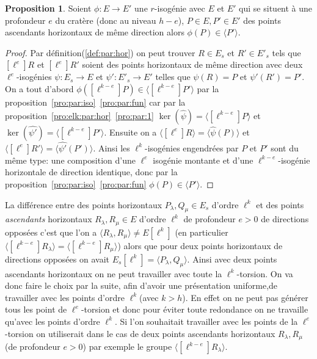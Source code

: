 \documentclass[10pt,a4paper]{book}
\theoremstyle{plain}
\theoremstyle{definition}
\theoremstyle{definition}
\theoremstyle{definition}
\theoremstyle{definition}
\newtheorem{prop}[thm]{Proposition}
\theoremstyle{definition}
\theoremstyle{remark}
\theoremstyle{remark}
\theoremstyle{definition}
\begin{document}
\begin{prop}
\label{pro:par:hor:par}
Soient $\phi: E \rightarrow E'$ une $r$-isogénie avec $E$ et $E'$ qui se
situent à une profondeur $e$ du cratère (donc au niveau $h-e$), $P \in E,P' \in
E'$ des points ascendants horizontaux de même direction alors $\phi(P) \in 
\langle P' \rangle$. 
\end{prop}

\begin{proof}
Par définition(\ref{def:par:hor}) on peut trouver
$R \in E_s$ et $R' \in E'_s$ tels que $[\ell^e]R$ et $[\ell^e]R'$ 
soient des points horizontaux de même direction avec deux $\ell^e$-isogénies 
$\psi:E_s \rightarrow E$ et $\psi':E'_s \rightarrow E'$ telles que $\psi(R)=P$ 
et $\psi'(R')=P'$. On a tout d'abord $ \phi([\ell^{k-e}]P) \in \langle 
[\ell^{k-e}]P' \rangle$  par la proposition~\ref{pro:par:iso}~\eqref{pro:par:fun} car par la 
proposition~\ref{pro:elk:par:hor}~\eqref{pro:par:1} $\ker(\widehat{\psi})= \langle 
[\ell^{k-e}]P \rangle$ et $\ker(\widehat{\psi'})= \langle [\ell^{k-e}]P' 
\rangle$. Ensuite on a $\langle [\ell^e]R \rangle = \langle 
\widehat{\psi}(P) \rangle $ et $\langle [\ell^e]R' \rangle = \langle 
\widehat{\psi'}(P') \rangle$. Ainsi les $\ell^{k}$-isogénies engendrées par 
$P$ et $P'$ sont du même type: une composition d'une $\ell^e$ isogénie montante 
et d'une $\ell^{k-e}$-isogénie horizontale de direction identique, donc par la 
proposition~\ref{pro:par:iso}~\eqref{pro:par:fun} $\phi(P) \in \langle P' \rangle$.
\end{proof}


La différence entre des points horizontaux $P_{\lambda}, Q_{\mu} \in E_s$ 
d'ordre $\ell^k$ et des points \emph{ascendants} horizontaux $R_{\lambda}, 
R_{\mu} \in E$ d'ordre $\ell^k$ de profondeur $e>0$ de directions opposées 
c'est que l'on a $\langle R_{\lambda}, R_{\mu} \rangle \neq E[\ell^k]$ (en 
particulier$\langle [\ell^{k-e}]R_{\lambda} \rangle = \langle 
[\ell^{k-e}]R_{\mu} \rangle$) alors que pour deux points horizontaux de 
directions opposées on avait $E_s[\ell^k]= \langle P_{\lambda}, Q_{\mu} \rangle$. 
Ainsi avec deux points ascendants horizontaux on ne peut travailler avec 
toute la $\ell^k$-torsion. On va donc faire le choix par la suite, afin d'avoir
une présentation uniforme,de travailler avec les points d'ordre $\ell^k$(avec 
$k>h$). En effet on ne peut pas générer tous les point de $\ell^e$-torsion et 
donc pour éviter toute redondance on ne travaille qu'avec les points d'ordre 
$\ell^k$. Si l'on souhaitait travailler avec les points de la $\ell^e$-torsion 
on utiliserait dans le cas de deux points ascendants horizontaux 
$R_{\lambda}, R_{\mu}$ (de profondeur $e>0$) par exemple le groupe $\langle 
[\ell^{k-e}]R_{\lambda} \rangle$.
\end{document}
